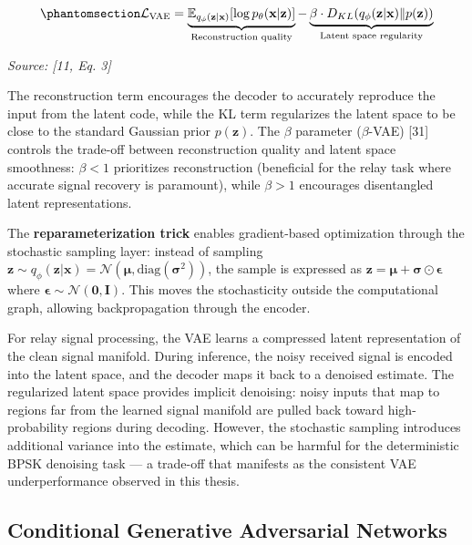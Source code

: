 \begin{equation}\protect\phantomsection\label{eq:vae-loss}{\mathcal{L}_{\text{VAE}} = \underbrace{\mathbb{E}_{q_\phi(\mathbf{z}|\mathbf{x})}[\log p_\theta(\mathbf{x}|\mathbf{z})]}_{\text{Reconstruction quality}} - \underbrace{\beta \cdot D_{KL}(q_\phi(\mathbf{z}|\mathbf{x}) \| p(\mathbf{z}))}_{\text{Latent space regularity}}
}\end{equation} \par{\small\textit{Source: [11, Eq. 3]}}

The reconstruction term encourages the decoder to accurately reproduce the input from the latent code, while the KL term regularizes the latent space to be close to the standard Gaussian prior \(p(\mathbf{z})\). The \(\beta\) parameter (\(\beta\)-VAE) {[}31{]} controls the trade-off between reconstruction quality and latent space smoothness: \(\beta < 1\) prioritizes reconstruction (beneficial for the relay task where accurate signal recovery is paramount), while \(\beta > 1\) encourages disentangled latent representations.

The \textbf{reparameterization trick} enables gradient-based optimization through the stochastic sampling layer: instead of sampling \(\mathbf{z} \sim q_\phi(\mathbf{z} | \mathbf{x}) = \mathcal{N}(\boldsymbol{\mu}, \text{diag}(\boldsymbol{\sigma}^2))\), the sample is expressed as \(\mathbf{z} = \boldsymbol{\mu} + \boldsymbol{\sigma} \odot \boldsymbol{\epsilon}\) where \(\boldsymbol{\epsilon} \sim \mathcal{N}(\mathbf{0}, \mathbf{I})\). This moves the stochasticity outside the computational graph, allowing backpropagation through the encoder.

For relay signal processing, the VAE learns a compressed latent representation of the clean signal manifold. During inference, the noisy received signal is encoded into the latent space, and the decoder maps it back to a denoised estimate. The regularized latent space provides implicit denoising: noisy inputs that map to regions far from the learned signal manifold are pulled back toward high-probability regions during decoding. However, the stochastic sampling introduces additional variance into the estimate, which can be harmful for the deterministic BPSK denoising task --- a trade-off that manifests as the consistent VAE underperformance observed in this thesis.

\subsection{Conditional Generative Adversarial Networks}\label{sec:conditional-generative-adversarial-networks}

